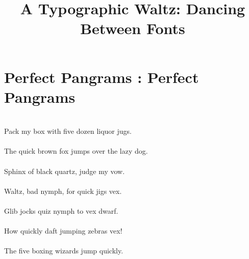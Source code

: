 \documentclass{article}
\begin{document}
\title{{\frakfamily A Typographic Waltz}: Dancing Between Fonts}
\author{} %
\date{}   %
\maketitle

\section*{\frakfamily Perfect Pangrams \normalfont: Perfect Pangrams}

 \\
\hspace{2em} Pack my box with five dozen liquor jugs. \medskip \\

 \\
\hspace{2em} The quick brown fox jumps over the lazy dog. \medskip \\

 \\
\hspace{2em} Sphinx of black quartz, judge my vow. \medskip \\

 \\
\hspace{2em} Waltz, bad nymph, for quick jigs vex. \medskip \\

 \\
\hspace{2em} Glib jocks quiz nymph to vex dwarf. \medskip \\

 \\
\hspace{2em} How quickly daft jumping zebras vex! \medskip \\

 \\
\hspace{2em} The five boxing wizards jump quickly. \medskip \\
\end{document}
